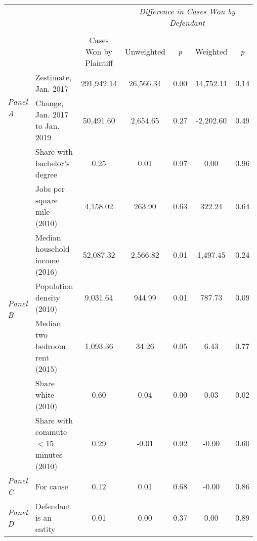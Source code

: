 \begin{tabular}{llccccc}
\toprule
 &  & \textit{} & \multicolumn{4}{c}{\textit{Difference in Cases Won by Defendant}} \\
\cline{4-7}
\\
 &  & Cases Won by Plaintiff & Unweighted & \emph{p} & Weighted & \emph{p} \\
\midrule
\multirow[c]{2}{3cm}{\textit{Panel A}} & Zestimate, Jan. 2017 & 291,942.14 & 26,566.34 & 0.00 & 14,752.11 & 0.14 \\
 & Change, Jan. 2017 to Jan. 2019 & 50,491.60 & 2,654.65 & 0.27 & -2,202.60 & 0.49 \\
\cline{1-7}
\multirow[c]{7}{3cm}{\textit{Panel B}} & Share with bachelor's degree & 0.25 & 0.01 & 0.07 & 0.00 & 0.96 \\
 & Jobs per square mile (2010) & 4,158.02 & 263.90 & 0.63 & 322.24 & 0.64 \\
 & Median household income (2016) & 52,087.32 & 2,566.82 & 0.01 & 1,497.45 & 0.24 \\
 & Population density (2010) & 9,031.64 & 944.99 & 0.01 & 787.73 & 0.09 \\
 & Median two bedroom rent (2015) & 1,093.36 & 34.26 & 0.05 & 6.43 & 0.77 \\
 & Share white (2010) & 0.60 & 0.04 & 0.00 & 0.03 & 0.02 \\
 & Share with commute $<$15 minutes (2010) & 0.29 & -0.01 & 0.02 & -0.00 & 0.60 \\
\cline{1-7}
\textit{Panel C} & For cause & 0.12 & 0.01 & 0.68 & -0.00 & 0.86 \\
\cline{1-7}
\textit{Panel D} & Defendant is an entity & 0.01 & 0.00 & 0.37 & 0.00 & 0.89 \\
\cline{1-7}
\bottomrule
\end{tabular}
